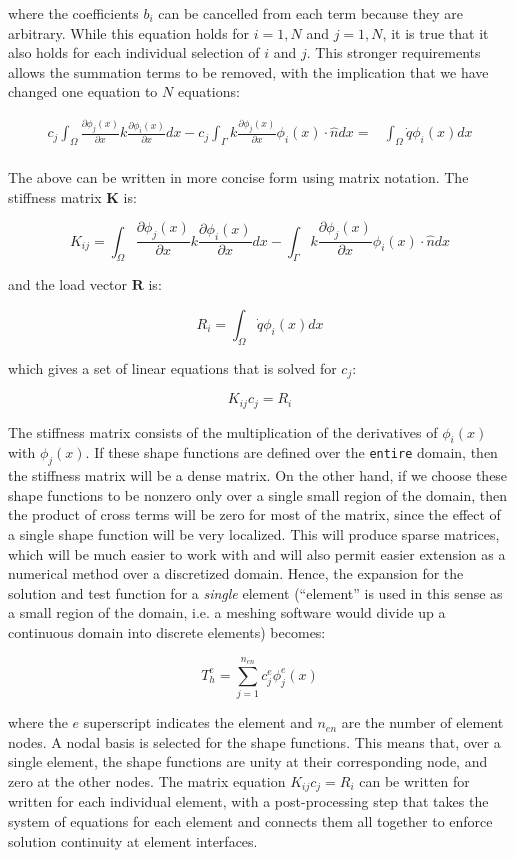 \documentclass[10pt]{article}
\newcommand{\beq}{\begin{equation}}
\newcommand{\eeq}{\end{equation}}
\newcommand{\beqa}{\begin{equation}\begin{aligned}}
\newcommand{\eeqa}{\end{aligned}\end{equation}}
\begin{document}
where the coefficients \(b_i\) can be cancelled from each term because they are arbitrary. While this equation holds for \(i=1, N\) and \(j=1, N\), it is true that it also holds for each individual selection of \(i\) and \(j\). This stronger requirements allows the summation terms to be removed, with the implication that we have changed one equation to \(N\) equations:

\beqa
c_j\int_{\Omega}\frac{\partial \phi_j(x)}{\partial x}k\frac{\partial\phi_i(x)}{\partial x}dx-c_j\int_{\Gamma}k\frac{\partial \phi_j(x)}{\partial x}\phi_i(x)\cdot\hat{n}dx=&\int_{\Omega}\dot{q}\phi_i(x)dx\\
\eeqa

The above can be written in more concise form using matrix notation. The stiffness matrix \textbf{K} is:

\beq
\label{eq:k}
K_{ij}=\int_{\Omega}\frac{\partial \phi_j(x)}{\partial x}k\frac{\partial\phi_i(x)}{\partial x}dx-\int_{\Gamma}k\frac{\partial \phi_j(x)}{\partial x}\phi_i(x)\cdot\hat{n}dx
\eeq

and the load vector \(\textbf{R}\) is:

\beq
R_{i}=\int_{\Omega}\dot{q}\phi_i(x)dx
\eeq

which gives a set of linear equations that is solved for \(c_j\):

\beq
K_{ij}c_j=R_i
\eeq

The stiffness matrix consists of the multiplication of the derivatives of \(\phi_i(x)\) with \(\phi_j(x)\). If these shape functions are defined over the {\tt entire} domain, then the stiffness matrix will be a dense matrix. On the other hand, if we choose these shape functions to be nonzero only over a single small region of the domain, then the product of cross terms will be zero for most of the matrix, since the effect of a single shape function will be very localized. This will produce sparse matrices, which will be much easier to work with and will also permit easier extension as a numerical method over a discretized domain. Hence, the expansion for the solution and test function for a {\it single} element (``element'' is used in this sense as a small region of the domain, i.e. a meshing software would divide up a continuous domain into discrete elements) becomes:

\beq
T_h^e=\sum_{j=1}^{n_{en}}c_j^e\phi_j^e(x)
\eeq

where the \(e\) superscript indicates the element and \(n_{en}\) are the number of element nodes. A nodal basis is selected for the shape functions. This means that, over a single element, the shape functions are unity at their corresponding node, and zero at the other nodes. The matrix equation \(K_{ij}c_j=R_i\) can be written for written for each individual element, with a post-processing step that takes the system of equations for each element and connects them all together to enforce solution continuity at element interfaces. 
\end{document}

